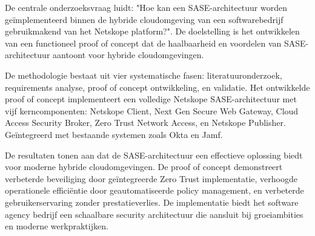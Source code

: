 \vspace{2ex}

De centrale onderzoeksvraag luidt: "Hoe kan een SASE-architectuur worden geïmplementeerd binnen de hybride cloudomgeving van een softwarebedrijf gebruikmakend van het Netskope platform?". De doelstelling is het ontwikkelen van een functioneel proof of concept dat de haalbaarheid en voordelen van SASE-architectuur aantoont voor hybride cloudomgevingen.

\vspace{2ex}

De methodologie bestaat uit vier systematische fasen: literatuuronderzoek, requirements analyse, proof of concept ontwikkeling, en validatie. Het ontwikkelde proof of concept implementeert een volledige Netskope SASE-architectuur met vijf kerncomponenten: Netskope Client, Next Gen Secure Web Gateway, Cloud Access Security Broker, Zero Trust Network Access, en Netskope Publisher. Geïntegreerd met bestaande systemen zoals Okta en Jamf.

\vspace{2ex}

De resultaten tonen aan dat de SASE-architectuur een effectieve oplossing biedt voor moderne hybride cloudomgevingen. De proof of concept demonstreert verbeterde beveiliging door geïntegreerde Zero Trust implementatie, verhoogde operationele efficiëntie door geautomatiseerde policy management, en verbeterde gebruikerservaring zonder prestatieverlies. De implementatie biedt het software agency bedrijf een schaalbare security architectuur die aansluit bij groeiambities en moderne werkpraktijken.
